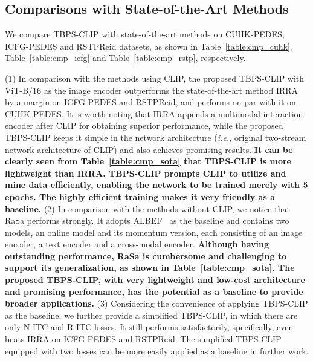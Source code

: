 \documentclass[letterpaper]{article} %
\begin{document}
\subsection{Comparisons with State-of-the-Art Methods} 
We compare TBPS-CLIP with state-of-the-art methods
on CUHK-PEDES, ICFG-PEDES and RSTPReid datasets, as shown in Table~\ref{table:cmp_cuhk}, Table~\ref{table:cmp_icfg} and Table~\ref{table:cmp_rstp}, respectively.

(1) In comparison with the methods using CLIP, the proposed TBPS-CLIP with ViT-B/16 as the image encoder outperforms the state-of-the-art method IRRA by a margin on ICFG-PEDES and RSTPReid, and performs on par with it on CUHK-PEDES.
It is worth noting that IRRA appends a multimodal interaction encoder after CLIP for obtaining superior performance, while the proposed TBPS-CLIP keeps it simple in the network architecture (\emph{i.e.,} original two-stream network architecture of CLIP) and also achieves promising results.
\textbf{It can be clearly seen from Table~\ref{table:cmp_sota} that TBPS-CLIP is more lightweight than IRRA.
TBPS-CLIP prompts CLIP to utilize and mine data efficiently, enabling the network to be trained merely with 5 epochs. 
The highly efficient training makes it very friendly as a baseline.}
(2) In comparison with the methods without CLIP, we notice that RaSa performs strongly.
It adopts ALBEF~\cite{li2021align} as the baseline and contains two models, an online model and its momentum version, each consisting of an image encoder, a text encoder and a cross-modal encoder.
\textbf{Although having outstanding performance, RaSa is cumbersome and challenging to support its generalization, as shown in Table~\ref{table:cmp_sota}.
The proposed TBPS-CLIP, with very lightweight and low-cost architecture and promising performance, has the potential as a baseline to provide broader applications.}
(3) Considering the convenience of applying TBPS-CLIP as the baseline, we further provide a simplified TBPS-CLIP, in which there are only N-ITC and R-ITC losses. It still performs satisfactorily, specifically, even beats IRRA on ICFG-PEDES and RSTPReid.
The simplified TBPS-CLIP equipped with two losses can be more easily applied as a baseline in further work.
\end{document}
